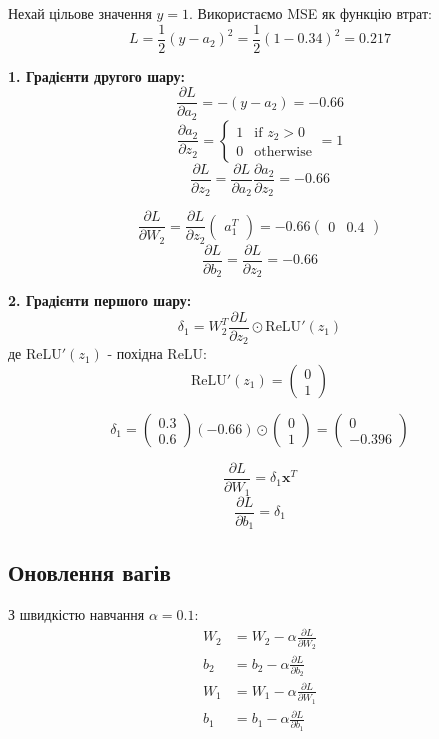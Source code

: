 \documentclass{article}
\begin{document}
Нехай цільове значення $y = 1$. Використаємо MSE як функцію втрат:
\[L = \frac{1}{2}(y - a_2)^2 = \frac{1}{2}(1 - 0.34)^2 = 0.217\]

\textbf{1. Градієнти другого шару:}
\[\frac{\partial L}{\partial a_2} = -(y - a_2) = -0.66\]
\[\frac{\partial a_2}{\partial z_2} = \begin{cases} 1 & \text{if } z_2 > 0 \\ 0 & \text{otherwise} \end{cases} = 1\]
\[\frac{\partial L}{\partial z_2} = \frac{\partial L}{\partial a_2}\frac{\partial a_2}{\partial z_2} = -0.66\]

\[\frac{\partial L}{\partial W_2} = \frac{\partial L}{\partial z_2}\begin{pmatrix} a_1^T \end{pmatrix} = -0.66 \begin{pmatrix} 0 & 0.4 \end{pmatrix}\]
\[\frac{\partial L}{\partial b_2} = \frac{\partial L}{\partial z_2} = -0.66\]

\textbf{2. Градієнти першого шару:}
\[\delta_1 = W_2^T\frac{\partial L}{\partial z_2}\odot\text{ReLU}'(z_1)\]
де $\text{ReLU}'(z_1)$ - похідна ReLU:
\[\text{ReLU}'(z_1) = \begin{pmatrix} 0 \\ 1 \end{pmatrix}\]

\[\delta_1 = \begin{pmatrix} 0.3 \\ 0.6 \end{pmatrix} (-0.66) \odot \begin{pmatrix} 0 \\ 1 \end{pmatrix} = \begin{pmatrix} 0 \\ -0.396 \end{pmatrix}\]

\[\frac{\partial L}{\partial W_1} = \delta_1\mathbf{x}^T\]
\[\frac{\partial L}{\partial b_1} = \delta_1\]

\subsection{Оновлення вагів}
З швидкістю навчання $\alpha = 0.1$:
\begin{align*}
W_2 &= W_2 - \alpha\frac{\partial L}{\partial W_2} \\
b_2 &= b_2 - \alpha\frac{\partial L}{\partial b_2} \\
W_1 &= W_1 - \alpha\frac{\partial L}{\partial W_1} \\
b_1 &= b_1 - \alpha\frac{\partial L}{\partial b_1}
\end{align*}
\end{document}
